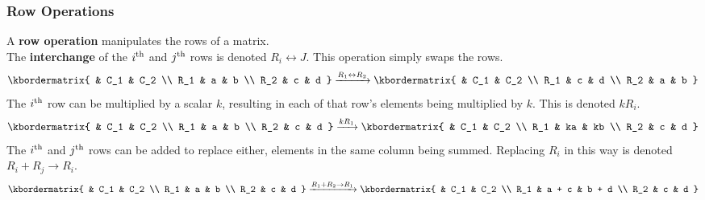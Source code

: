 \documentclass[../AP_Physics_C/mech]{subfiles}
\begin{document}
 				\subsubsection{Row Operations}
 					A \textbf{row operation} manipulates the rows of a matrix. \\
 					The \textbf{interchange} of the $i^{\mathrm{th}}$ and $j^{\mathrm{th}}$ rows is denoted $R_i \leftrightarrow J$. This operation simply swaps the rows.
 					\[
 						\kbordermatrix{
 							& C_1 & C_2 \\
 							R_1 & a & b \\
 							R_2 & c & d
 						} \xrightarrow{R_1 \leftrightarrow R_2}
 						\kbordermatrix{
 							& C_1 & C_2 \\
 							R_1 & c & d \\
 							R_2 & a & b
 						}
 					\]
 					The $i^{\mathrm{th}}$ row can be multiplied by a scalar $k$, resulting in each of that row's elements being multiplied by $k$. This is denoted $kR_i$.
 					\[
 						\kbordermatrix{
 							& C_1 & C_2 \\
 							R_1 & a & b \\
 							R_2 & c & d
 						} \xrightarrow{kR_1}
 						\kbordermatrix{
 							& C_1 & C_2 \\
 							R_1 & ka & kb \\
 							R_2 & c & d
 						}
 					\]
 					The $i^{\mathrm{th}}$ and $j^{\mathrm{th}}$ rows can be added to replace either, elements in the same column being summed. Replacing $R_i$ in this way is denoted $R_i + R_j \to R_i$.
 					\[
 						\kbordermatrix{
 							& C_1 & C_2 \\
 							R_1 & a & b \\
 							R_2 & c & d
 						} \xrightarrow{R_1 + R_2 \to R_1}
 						\kbordermatrix{
 							& C_1 & C_2 \\
 							R_1 & a + c & b + d \\
 							R_2 & c & d
 						} 
 					\]
\end{document}
